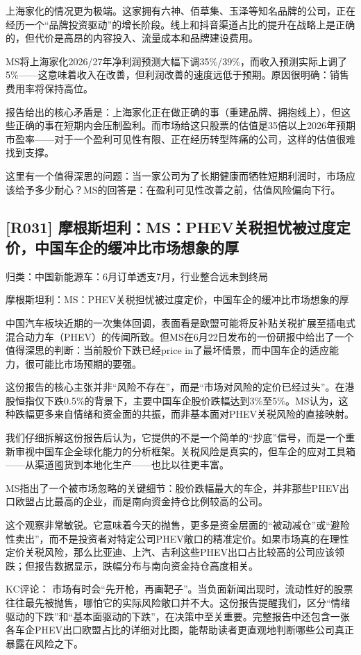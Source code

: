 \documentclass[11pt]{ctexart}
\begin{document}
上海家化的情况更为极端。这家拥有六神、佰草集、玉泽等知名品牌的公司，正在经历一个“品牌投资驱动”的增长阶段。线上和抖音渠道占比的提升在战略上是正确的，但代价是高昂的内容投入、流量成本和品牌建设费用。

MS将上海家化2026/27年净利润预测大幅下调35\%/39\%，而收入预测实际上调了5\%——这意味着收入在改善，但利润改善的速度远低于预期。原因很明确：销售费用率将保持高位。

报告给出的核心矛盾是：上海家化正在做正确的事（重建品牌、拥抱线上），但这些正确的事在短期内会压制盈利。而市场给这只股票的估值是35倍以上2026年预期市盈率——对于一个盈利可见性有限、正在经历转型阵痛的公司，这样的估值很难找到支撑。

这里有一个值得深思的问题：当一家公司为了长期健康而牺牲短期利润时，市场应该给予多少耐心？MS的回答是：在盈利可见性改善之前，估值风险偏向下行。

\subsection{[R031] 摩根斯坦利：MS：PHEV关税担忧被过度定价，中国车企的缓冲比市场想象的厚}
{\small\color{refgray}归类：中国新能源车：6月订单透支7月，行业整合远未到终局}

摩根斯坦利：MS：PHEV关税担忧被过度定价，中国车企的缓冲比市场想象的厚

中国汽车板块近期的一次集体回调，表面看是欧盟可能将反补贴关税扩展至插电式混合动力车（PHEV）的传闻所致。但MS在6月22日发布的一份研报中给出了一个值得深思的判断：当前股价下跌已经price in了最坏情景，而中国车企的适应能力，很可能比市场预期的要强。

这份报告的核心主张并非“风险不存在”，而是“市场对风险的定价已经过头”。在港股恒指仅下跌0.5\%的背景下，主要中国车企股价跌幅达到3\%至5\%。MS认为，这种跌幅更多来自情绪和资金面的共振，而非基本面对PHEV关税风险的直接映射。

我们仔细拆解这份报告后认为，它提供的不是一个简单的“抄底”信号，而是一个重新审视中国车企全球化能力的分析框架。关税风险是真实的，但车企的应对工具箱——从渠道囤货到本地化生产——也比以往更丰富。

MS指出了一个被市场忽略的关键细节：股价跌幅最大的车企，并非那些PHEV出口欧盟占比最高的企业，而是南向资金持仓比例较高的公司。

这个观察非常敏锐。它意味着今天的抛售，更多是资金层面的“被动减仓”或“避险性卖出”，而不是投资者对特定公司PHEV敞口的精准定价。如果市场真的在理性定价关税风险，那么比亚迪、上汽、吉利这些PHEV出口占比较高的公司应该领跌；但报告数据显示，跌幅分布与南向资金持仓高度相关。

KC评论： 市场有时会“先开枪，再画靶子”。当负面新闻出现时，流动性好的股票往往最先被抛售，哪怕它的实际风险敞口并不大。这份报告提醒我们，区分“情绪驱动的下跌”和“基本面驱动的下跌”，在决策中至关重要。完整报告中还包含一张各车企PHEV出口欧盟占比的详细对比图，能帮助读者更直观地判断哪些公司真正暴露在风险之下。
\end{document}
